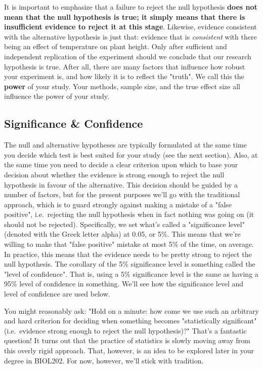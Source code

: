\documentclass[
]{book}
\begin{document}
It is important to emphasize that a failure to reject the null hypothesis \textbf{does not mean that the null hypothesis is true; it simply means that there is insufficient evidence to reject it at this stage}. Likewise, evidence consistent with the alternative hypothesis is just that: evidence that is \emph{consistent} with there being an effect of temperature on plant height. Only after sufficient and independent replication of the experiment should we conclude that our research hypothesis is true. After all, there are many factors that influence how robust your experiment is, and how likely it is to reflect the "truth". We call this the \textbf{power} of your study. Your methods, sample size, and the true effect size all influence the power of your study.

\hypertarget{significance-confidence}{%
\subsection*{Significance \& Confidence}\label{significance-confidence}}

The null and alternative hypotheses are typically formulated at the same time you decide which test is best suited for your study (see the next section). Also, at the same time you need to decide a clear criterion upon which to base your decision about whether the evidence is strong enough to reject the null hypothesis in favour of the alternative. This decision should be guided by a number of factors, but for the present purposes we'll go with the traditional approach, which is to guard strongly against making a mistake of a "false positive", i.e.~rejecting the null hypothesis when in fact nothing was going on (it should not be rejected). Specifically, we set what's called a "significance level" (denoted with the Greek letter alpha) at 0.05, or 5\%. This means that we're willing to make that "false positive" mistake at most 5\% of the time, on average. In practice, this means that the evidence needs to be pretty strong to reject the null hypothesis. The corollary of the 5\% significance level is something called the "level of confidence". That is, using a 5\% significance level is the same as having a 95\% level of confidence in something. We'll see how the significance level and level of confidence are used below.

You might reasonably ask: "Hold on a minute: how come we use such an arbitrary and hard criterion for deciding when something becomes "statistically significant" (i.e.~evidence strong enough to reject the null hypothesis)?" That's a fantastic question! It turns out that the practice of statistics is slowly moving away from this overly rigid approach. That, however, is an idea to be explored later in your degree in BIOL202. For now, however, we'll stick with tradition.
\end{document}

